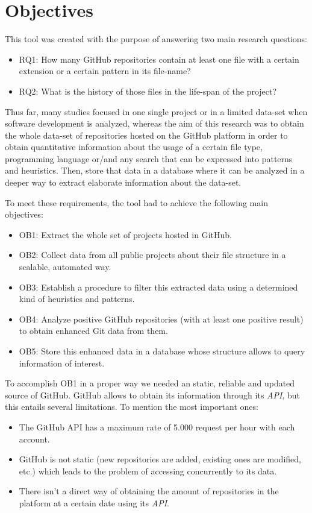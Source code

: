 \documentclass[a4paper, 12pt]{book}
\begin{document}
\chapter{Objectives}
\label{sec:objectives}
This tool was created with the purpose of answering two main research questions:
\begin{itemize}
  \item RQ1: How many GitHub repositories contain at least one file with a certain extension or a certain
        pattern in its file-name?
  \item RQ2: What is the history of those files in the life-span of the project?
\end{itemize}
Thus far, many studies focused in one single project or in a limited data-set when software development is analyzed,
whereas the aim of this research was to obtain the whole data-set of repositories hosted on the GitHub platform
in order to obtain quantitative information about the usage of a certain file type, programming language
or/and any search that can be expressed into patterns and heuristics. Then, store that data in a database
where it can be analyzed in a deeper way to extract elaborate information about the data-set.\par
To meet these requirements, the tool had to achieve the following main objectives:
\begin{itemize}
  \item OB1: Extract the whole set of projects hosted in GitHub.
  \item OB2: Collect data from all public projects about their file structure in a scalable, automated way.
  \item OB3: Establish a procedure to filter this extracted data using a determined kind of heuristics and patterns.
  \newpage
  \item OB4: Analyze positive GitHub repositories (with at least one positive result) to obtain enhanced Git data from them.
  \item OB5: Store this enhanced data in a database whose structure allows to query information of interest.
\end{itemize}
To accomplish OB1 in a proper way we needed an static, reliable and updated source of GitHub.
GitHub allows to obtain its information through its \textit{API},
but this entails several limitations. To mention the most important ones:
\begin{itemize}
    \item The GitHub API has a maximum rate of 5.000 request per hour with each account.
    \item GitHub is not static (new repositories are added, existing ones are modified, etc.) which leads to the problem of
    accessing concurrently to its data.
    \item There isn't a direct way
    of obtaining the amount of repositories in the platform at a certain date using its \textit{API}.
\end{itemize}
\end{document}
